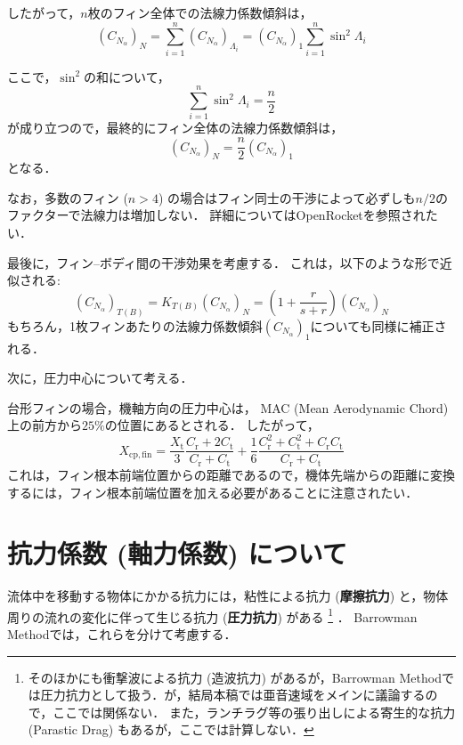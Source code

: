 \documentclass[uplatex,dvipdfmx,a4j,11pt]{jsarticle}
\begin{document}
したがって，$n$枚のフィン全体での法線力係数傾斜は，
\begin{equation}
  (C_{N_\alpha})_N = \sum_{i=1}^{n} (C_{N_\alpha})_{\Lambda_i} = (C_{N_\alpha})_1 \sum_{i=1}^{n} \sin^2\Lambda_i
  \tag{OR.3.52}
\end{equation}

ここで，$\sin^2$の和について，
\begin{equation}
  \sum_{i=1}^{n} \sin^2\Lambda_i = \frac{n}{2}
  \tag{OR.3.53}
\end{equation}
が成り立つので，最終的にフィン全体の法線力係数傾斜は，
\begin{equation}
  (C_{N_\alpha})_N = \frac{n}{2}(C_{N_\alpha})_1
\end{equation}
となる．

なお，多数のフィン ($n > 4$) の場合はフィン同士の干渉によって必ずしも$n/2$のファクターで法線力は増加しない．
詳細についてはOpenRocket\cite{OpenRocket1}を参照されたい．

\enskip

最後に，フィン--ボディ間の干渉効果を考慮する．
これは，以下のような形で近似される:
\begin{equation}
  (C_{N_\alpha})_{T(B)} = K_{T(B)} (C_{N_\alpha})_N = \left(1 + \frac{r}{s + r}\right) (C_{N_\alpha})_N
  \tag{OR.3.56}
\end{equation}
もちろん，1枚フィンあたりの法線力係数傾斜$(C_{N_\alpha})_1$についても同様に補正される．


\enskip

次に，圧力中心について考える．

台形フィンの場合，機軸方向の圧力中心は，
MAC (Mean Aerodynamic Chord) 上の前方から$25\%$の位置にあるとされる．
したがって，
\begin{equation}
  X_{\mathrm{cp, fin}} = \frac{X_\mathrm{t}}{3}\frac{C_\mathrm{r} + 2C_\mathrm{t}}{C_\mathrm{r} + C_\mathrm{t}} + \frac{1}{6}\frac{C_\mathrm{r}^2 + C_\mathrm{t}^2 + C_\mathrm{r}C_\mathrm{t}}{C_\mathrm{r} + C_\mathrm{t}}
  \tag{OR.3.34}
\end{equation}
これは，フィン根本前端位置からの距離であるので，機体先端からの距離に変換するには，フィン根本前端位置を加える必要があることに注意されたい．

\section{抗力係数 (軸力係数) について}

流体中を移動する物体にかかる抗力には，粘性による抗力 (\textbf{摩擦抗力}) と，物体周りの流れの変化に伴って生じる抗力 (\textbf{圧力抗力}) がある
\footnote{そのほかにも衝撃波による抗力 (造波抗力) があるが，Barrowman Methodでは圧力抗力として扱う．が，結局本稿では亜音速域をメインに議論するので，ここでは関係ない．
また，ランチラグ等の張り出しによる寄生的な抗力 (Parastic Drag) もあるが，ここでは計算しない．
}
．
Barrowman Methodでは，これらを分けて考慮する．
\end{document}
